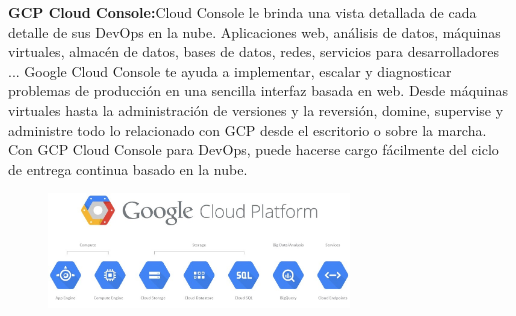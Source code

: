 \documentclass[11pt]{article}
\begin{document}
\item \textbf{GCP Cloud Console:}Cloud Console le brinda una vista detallada de cada detalle de sus DevOps en la nube. Aplicaciones web, análisis de datos, máquinas virtuales, almacén de datos, bases de datos, redes, servicios para desarrolladores ... Google Cloud Console te ayuda a implementar, escalar y diagnosticar problemas de producción en una sencilla interfaz basada en web. Desde máquinas virtuales hasta la administración de versiones y la reversión, domine, supervise y administre todo lo relacionado con GCP desde el escritorio o sobre la marcha. Con GCP Cloud Console para DevOps, puede hacerse cargo fácilmente del ciclo de entrega continua basado en la nube.
\begin{figure}[htb]
\begin{center}
\includegraphics[width=8cm]{./images/imagen2.jpg}
\end{center}
\end{figure}
 \vfill
\end{document}

